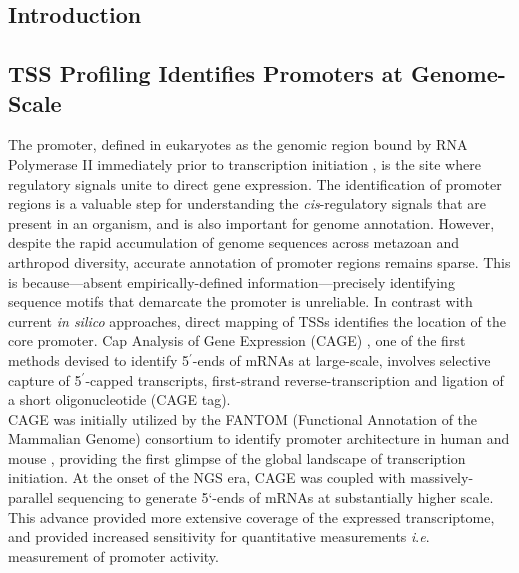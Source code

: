 \documentclass[runningheads,a4paper]{llncs}
\begin{document}
\begin{linenumbers}
\section{Introduction}

\subsection{TSS Profiling Identifies Promoters at Genome-Scale}
The promoter, defined in eukaryotes as the genomic region bound by RNA Polymerase II immediately prior to transcription initiation \cite{Kadonaga:2011gz}, is the site where regulatory signals unite to direct gene expression.
The identification of promoter regions is a valuable step for understanding the \textit{cis}-regulatory signals that are present in an organism, and is also important for genome annotation.
However, despite the rapid accumulation of genome sequences across metazoan and arthropod diversity, accurate annotation of promoter regions remains sparse. 
This is because---absent empirically-defined information---precisely identifying sequence motifs that demarcate the promoter is unreliable.
In contrast with current \textit{in silico} approaches, direct mapping of TSSs identifies the location of the core promoter.
Cap Analysis of Gene Expression (CAGE) \cite{Kodzius:2006gy}, one of the first methods devised to identify 5$^\prime$-ends of mRNAs at large-scale, involves selective capture of 5$^\prime$-capped transcripts, first-strand reverse-transcription and ligation of a short oligonucleotide (CAGE tag). \\
CAGE was initially utilized by the FANTOM (Functional Annotation of the Mammalian Genome) consortium to identify promoter architecture in human and mouse \cite{Carninci:2005kp}, providing the first glimpse of the global landscape of transcription initiation.
At the onset of the NGS era, CAGE was coupled with massively-parallel sequencing to generate 5`-ends of mRNAs at substantially higher scale. 
This advance provided more extensive coverage of the expressed transcriptome, and provided increased sensitivity for quantitative measurements \textit{i}.\textit{e}. measurement of promoter activity.


\end{linenumbers}
\end{document}
